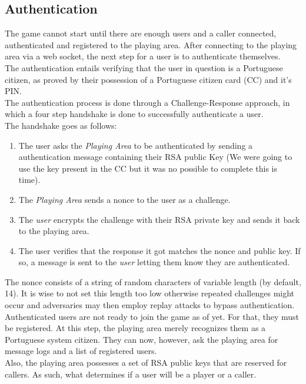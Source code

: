 \documentclass[11pt]{article}
\begin{document}
\subsection{Authentication}
The game cannot start until there are enough users and a caller connected, authenticated and registered to the playing area. After connecting to the playing area via a web socket, the next step for a user is to authenticate themselves. \\
The authentication entails verifying that the user in question is a Portuguese citizen, as proved by their possession of a Portuguese citizen card (CC) and it’s PIN. \\ The authentication process is done through a Challenge-Response approach, in which a four step handshake is done to successfully authenticate a user.
\\ The handshake goes as follows:

\begin{enumerate}
  \item The user asks the \emph{Playing Area} to be authenticated by sending a authentication message containing their RSA public Key (We were going to use the key present in the CC but it was no possible to complete this is time).
  \item The \emph{Playing Area} sends a nonce to the user as a challenge.
  \item The \emph{user} encrypts the challenge with their RSA private key and sends it back to the playing area.
  \item The user verifies that the response it got matches the nonce and public key. If so, a message is sent to the \emph{user} letting them know they are authenticated.
\end{enumerate}
The nonce consists of a string of random characters of variable length (by default, 14). It is wise to not set this length too low otherwise repeated challenges might occur and adversaries may then employ replay attacks to bypass authentication. \\ Authenticated users are not ready to join the game as of yet. For that, they must be registered. At this step, the playing area merely recognizes them as a Portuguese system citizen. They can now, however, ask the playing area for message logs and a list of registered users. \\ Also, the playing area possesses a set of RSA public keys that are reserved for callers. As such, what determines if a user will be a player or a caller.
\end{document}
